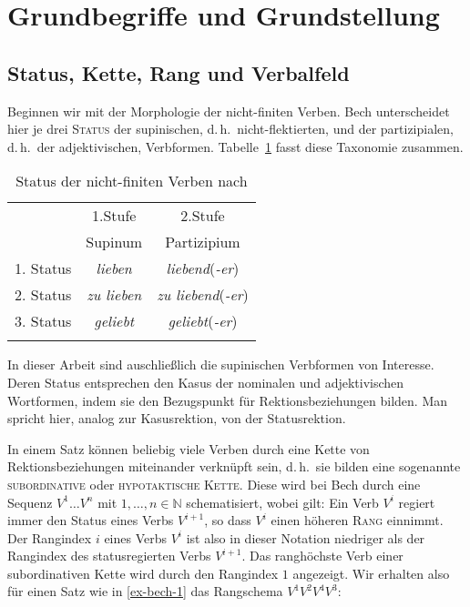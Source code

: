 \section{Grundbegriffe und Grundstellung} \label{sec-kohaerenz-einf}

\subsection{Status, Kette, Rang und Verbalfeld}

Beginnen wir mit der Morphologie der nicht-finiten Verben. Bech unterscheidet hier je drei \textsc{Status} der supinischen, d.\,h.\ nicht-flektierten, und der partizipialen, d.\,h.\ der adjektivischen, Verb\-for\-men. Tabelle~\ref{fig-status} fasst diese Taxonomie zusammen.   
\begin{table}[h] %
\centering
\begin{tabular}{ccc}
\lsptoprule
& 1.Stufe	& 2.Stufe 	\\
& Supinum	& Partizipium	\\
\cmidrule{2-3}
1. Status	& \emph{lieben}	& \emph{liebend}(\emph{-er})\\
2. Status	& \emph{zu lieben} & \emph{zu liebend}(\emph{-er})\\
3. Status	& \emph{geliebt}& \emph{geliebt}(\emph{-er})\\
\lspbottomrule
\end{tabular}
\caption{Status der nicht-finiten Verben nach \cite{Bech:55} \label{fig-status}}
\end{table}

In dieser Arbeit sind auschlie\ss lich die supinischen Verb\-formen von Interesse. Deren Status entsprechen den Kasus der nominalen und adjektivischen Wortformen, indem sie den Bezugspunkt für Rektionsbeziehungen bilden. Man spricht hier, analog zur Kasusrektion, von der Statusrektion. 

In einem Satz können beliebig viele Verben durch eine Kette von Rektionsbeziehungen miteinander verknüpft sein, d.\,h.\ sie bilden eine sogenannte \textsc{subordinative} oder \textsc{hypotaktische Kette}. Diese wird bei Bech durch eine Sequenz $V^{1} \ldots V^{n}$ mit $1, \ldots , n \in \mathbb{N}$ schematisiert, wobei gilt: Ein Verb $V^i$ regiert immer den Status eines Verbs $V^{i+1}$, so dass $V^i$ einen höheren \textsc{Rang} einnimmt. Der Rangindex $i$ eines Verbs $V^i$ ist also in dieser Notation niedriger als der Rangindex des statusregierten Verbs $V^{i+1}$. Das ranghöchste Verb einer subordinativen Kette wird durch den Rangindex $1$ angezeigt. Wir erhalten also für einen Satz wie in \ref{ex-bech-1} das Rangschema $V^1 V^2 V^4 V^3$:

